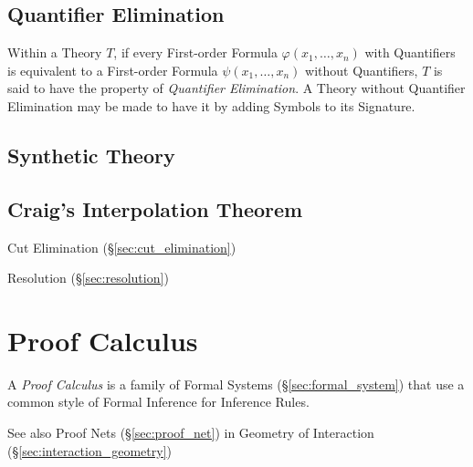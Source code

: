 \subsection{Quantifier Elimination}\label{sec:quantifier_elimination}

Within a Theory $T$, if every First-order Formula $\varphi(x_1,
\ldots, x_n)$ with Quantifiers is equivalent to a First-order Formula
$\psi(x_1, \ldots, x_n)$ without Quantifiers, $T$ is said to have the
property of \emph{Quantifier Elimination}. A Theory without Quantifier
Elimination may be made to have it by adding Symbols to its Signature.



\subsection{Synthetic Theory}\label{sec:synthetic_theory}

\subsection{Craig's Interpolation Theorem}
\label{sec:interpolation_theorem}

Cut Elimination (\S\ref{sec:cut_elimination})

Resolution (\S\ref{sec:resolution})



\section{Proof Calculus}\label{sec:proof_calculus}

A \emph{Proof Calculus} is a family of Formal Systems
(\S\ref{sec:formal_system}) that use a common style of Formal
Inference for Inference Rules.

\fist See also Proof Nets (\S\ref{sec:proof_net}) in Geometry of
Interaction (\S\ref{sec:interaction_geometry})



